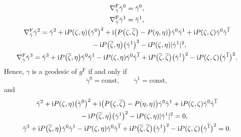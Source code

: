 \documentclass[11pt]{article}
\numberwithin{equation}{section}
\newcommand\ol{\overline}
\numberwithin{equation}{section}
\begin{document}
\begin{gather*}
\nabla^{\mathrm{F}}_{\dot\gamma}\dot\gamma^0=\ddot\gamma^0, \\
\nabla^{\mathrm{F}}_{\dot\gamma}\dot\gamma^1=\ddot\gamma^1, \\
\nabla^{\mathrm{F}}_{\dot\gamma}\dot\gamma^2
= \ddot\gamma^2+{\rm i}P(\zeta, \eta)\bigl(\dot\gamma^0\bigr)^2+{\rm i}\bigl(P\bigl(\zeta, \ol\zeta\bigr)-P(\eta, \eta)\bigr)\dot\gamma^0\dot\gamma^1+{\rm i}P(\zeta, \zeta)\dot\gamma^0\dot\gamma^{\ol1} \\
\hphantom{\nabla^{\mathrm{F}}_{\dot\gamma}\dot\gamma^2=}{}
-{\rm i}P\bigl(\ol\zeta, \eta\bigr)\bigl(\dot\gamma^1\bigr)^2-{\rm i}P(\zeta, \eta)|\dot\gamma^1|^2, \\
\nabla^{\mathrm{F}}_{\dot\gamma}\dot\gamma^3
=\ddot\gamma^3+{\rm i}P\bigl(\ol\zeta, \eta\bigr)\dot\gamma^0\dot\gamma^1-{\rm i}P(\zeta, \eta)\dot\gamma^0\dot\gamma^{\ol1}+{\rm i}P\bigl(\ol\zeta, \ol\zeta\bigr)\bigl(\dot\gamma^1\bigr)^2-{\rm i}P(\zeta, \zeta)\bigl(\dot\gamma^{\ol1}\bigr)^2.
\end{gather*}
Hence, $\gamma$ is a geodesic of $g^{\mathrm{F}}$ if and only if
\begin{equation*}
\dot\gamma^0=\mathrm{const}, \qquad \dot\gamma^1=\mathrm{const},
\end{equation*}
and
\begin{gather}
 \ddot\gamma^2+{\rm i}P(\zeta, \eta)\bigl(\dot\gamma^0\bigr)^2+{\rm i}\bigl(P\bigl(\zeta, \ol\zeta\bigr)-P(\eta, \eta)\bigr)\dot\gamma^0\dot\gamma^1+{\rm i}P(\zeta, \zeta) \dot\gamma^0\dot\gamma^{\ol1} \nonumber \\
 \qquad{} -{\rm i}P\bigl(\ol\zeta, \eta\bigr)\bigl(\dot\gamma^1\bigr)^2-{\rm i}P(\zeta, \eta)|\dot\gamma^1|^2=0,\label{geodesic2}
\\
\ddot\gamma^3+{\rm i}P\bigl(\ol\zeta, \eta\bigr)\dot\gamma^0\dot\gamma^1-{\rm i}P(\zeta, \eta)\dot\gamma^0\dot\gamma^{\ol1}+{\rm i}P\bigl(\ol\zeta, \ol\zeta\bigr)\bigl(\dot\gamma^1\bigr)^2-{\rm i}P(\zeta, \zeta)\bigl(\dot\gamma^{\ol1}\bigr)^2=0.\label{geodesic3}
\end{gather}
\end{document}
